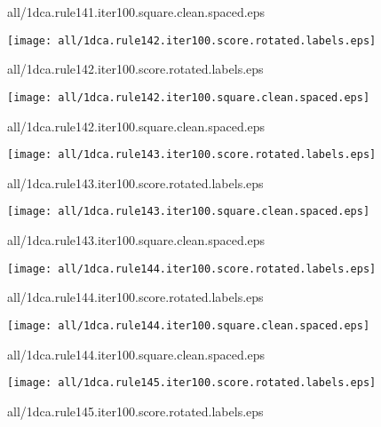 \documentclass{article}
\begin{document}
{\footnotesize all/1dca.rule141.iter100.square.clean.spaced.eps}
\begin{center}
\begin{minipage}{\textwidth}
\texttt{[image: all/1dca.rule142.iter100.score.rotated.labels.eps]}
\end{minipage}
\end{center}
{\footnotesize all/1dca.rule142.iter100.score.rotated.labels.eps}
\begin{center}
\begin{minipage}{\textwidth}
\texttt{[image: all/1dca.rule142.iter100.square.clean.spaced.eps]}
\end{minipage}
\end{center}
{\footnotesize all/1dca.rule142.iter100.square.clean.spaced.eps}
\begin{center}
\begin{minipage}{\textwidth}
\texttt{[image: all/1dca.rule143.iter100.score.rotated.labels.eps]}
\end{minipage}
\end{center}
{\footnotesize all/1dca.rule143.iter100.score.rotated.labels.eps}
\begin{center}
\begin{minipage}{\textwidth}
\texttt{[image: all/1dca.rule143.iter100.square.clean.spaced.eps]}
\end{minipage}
\end{center}
{\footnotesize all/1dca.rule143.iter100.square.clean.spaced.eps}
\begin{center}
\begin{minipage}{\textwidth}
\texttt{[image: all/1dca.rule144.iter100.score.rotated.labels.eps]}
\end{minipage}
\end{center}
{\footnotesize all/1dca.rule144.iter100.score.rotated.labels.eps}
\begin{center}
\begin{minipage}{\textwidth}
\texttt{[image: all/1dca.rule144.iter100.square.clean.spaced.eps]}
\end{minipage}
\end{center}
{\footnotesize all/1dca.rule144.iter100.square.clean.spaced.eps}
\begin{center}
\begin{minipage}{\textwidth}
\texttt{[image: all/1dca.rule145.iter100.score.rotated.labels.eps]}
\end{minipage}
\end{center}
{\footnotesize all/1dca.rule145.iter100.score.rotated.labels.eps}
\end{document}
